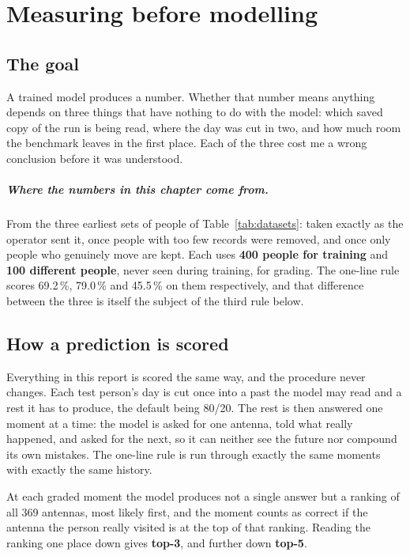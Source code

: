 \chapter{Measuring before modelling}
\label{ch:first}

\section{The goal}

A trained model produces a number. Whether that number means anything depends on
three things that have nothing to do with the model: which saved copy of the run
is being read, where the day was cut in two, and how much room the benchmark
leaves in the first place. Each of the three cost me a wrong conclusion before it
was understood.

\paragraph{Where the numbers in this chapter come from.} From the three earliest
sets of people of Table~\ref{tab:datasets}: \Draw{} taken exactly as the operator
sent it, \Dfilt{} once people with too few records were removed, and \Dmob{} once
only people who genuinely move are kept. Each uses \textbf{400 people for
training} and \textbf{100 different people}, never seen during training, for
grading. The one-line rule scores 69.2\,\%, 79.0\,\% and 45.5\,\% on them
respectively, and that difference between the three is itself the subject of the
third rule below.



\section{How a prediction is scored}

Everything in this report is scored the same way, and the procedure never
changes. Each test person's day is cut once into a past the model may read and a
rest it has to produce, the default being 80/20. The rest is then answered one
moment at a time: the model is asked for one antenna, told what really happened,
and asked for the next, so it can neither see the future nor compound its own
mistakes. The one-line rule is run through exactly the same moments with exactly
the same history.



At each graded moment the model produces not a single answer but a ranking of all
369 antennas, most likely first, and the moment counts as correct if the antenna
the person really visited is at the top of that ranking. Reading the ranking one
place down gives \textbf{top-3}, and further down \textbf{top-5}.

